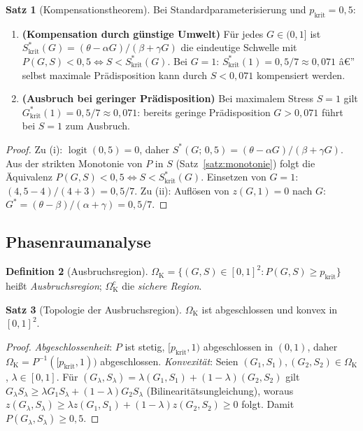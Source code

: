 ﻿\documentclass[12pt, a4paper]{article}
\theoremstyle{definition}
\newtheorem{definition}{Definition}[section]
\newtheorem{satz}[definition]{Satz}
\theoremstyle{remark}
\DeclareMathOperator{\logit}{logit}
\begin{document}
\begin{satz}[Kompensationstheorem]
\label{satz:kompensation}
Bei Standardparameterisierung und $p_{\mathrm{krit}} = 0{,}5$:
\begin{enumerate}[label=(\roman*)]
  \item \textbf{(Kompensation durch günstige Umwelt)}
    Für jedes $G \in (0,1]$ ist
    $S^*_{\mathrm{krit}}(G) = (\theta - \alpha G)/(\beta + \gamma G)$
    die eindeutige Schwelle mit $P(G,S) < 0{,}5 \iff S < S^*_{\mathrm{krit}}(G)$.
    Bei $G=1$: $S^*_{\mathrm{krit}}(1) = 0{,}5/7 \approx 0{,}071$ â€”
    selbst maximale Prädisposition kann durch $S < 0{,}071$ kompensiert werden.
  \item \textbf{(Ausbruch bei geringer Prädisposition)}
    Bei maximalem Stress $S=1$ gilt $G^*_{\mathrm{krit}}(1) = 0{,}5/7 \approx 0{,}071$:
    bereits geringe Prädisposition $G > 0{,}071$ führt bei $S=1$ zum Ausbruch.
\end{enumerate}
\end{satz}

\begin{proof}
Zu (i): $\logit(0{,}5) = 0$, daher $S^*(G;\,0{,}5) = (\theta - \alpha G)/(\beta + \gamma G)$.
Aus der strikten Monotonie von $P$ in $S$ (Satz~\ref{satz:monotonie}) folgt
die Äquivalenz $P(G,S) < 0{,}5 \iff S < S^*_{\mathrm{krit}}(G)$.
Einsetzen von $G=1$: $(4{,}5 - 4)/(4 + 3) = 0{,}5/7$.
Zu (ii): Auflösen von $z(G,1) = 0$ nach $G$: $G^* = (\theta - \beta)/(\alpha + \gamma)
= 0{,}5/7$.
\end{proof}

\subsection{Phasenraumanalyse}

\begin{definition}[Ausbruchsregion]
\label{def:ausbruchsregion}
$\Omega_{\mathrm{K}} = \{(G,S) \in [0,1]^2 : P(G,S) \geq p_{\mathrm{krit}}\}$
heißt \emph{Ausbruchsregion}; $\Omega_{\mathrm{K}}^c$ die \emph{sichere Region}.
\end{definition}

\begin{satz}[Topologie der Ausbruchsregion]
\label{satz:topologie}
$\Omega_{\mathrm{K}}$ ist abgeschlossen und konvex in $[0,1]^2$.
\end{satz}

\begin{proof}
\emph{Abgeschlossenheit}: $P$ ist stetig, $[p_{\mathrm{krit}},1)$ abgeschlossen in $(0,1)$,
daher $\Omega_{\mathrm{K}} = P^{-1}([p_{\mathrm{krit}},1))$ abgeschlossen.
\emph{Konvexität}: Seien $(G_1,S_1), (G_2,S_2) \in \Omega_{\mathrm{K}}$, $\lambda \in [0,1]$.
Für $(G_\lambda, S_\lambda) = \lambda(G_1,S_1)+(1-\lambda)(G_2,S_2)$ gilt
$G_\lambda S_\lambda \geq \lambda G_1 S_\lambda + (1-\lambda)G_2 S_\lambda$
(Bilinearitätsungleichung), woraus $z(G_\lambda, S_\lambda) \geq \lambda z(G_1,S_1) + (1-\lambda)z(G_2,S_2) \geq 0$
folgt. Damit $P(G_\lambda,S_\lambda) \geq 0{,}5$.
\end{proof}
\end{document}
